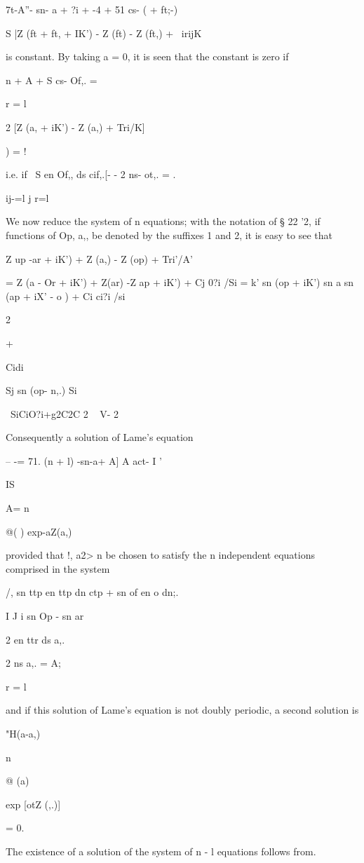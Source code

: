 {{{{{{{{7t-A''- sn- a + ?i + -4 + 51 cs- ( + ft;-)

S |Z (ft + ft, + IK') - Z (ft) - Z (ft,) + \ irijK\

%
%

is constant. By taking a = 0, it is seen that the constant is zero if

n + A + S cs- Of,. =

r = l

2 [Z (a, + iK') - Z (a,) + Tri/K]

) = !

i.e. if \ S en Of,, ds cif,.[- - 2 ns- ot,. = .

ij-=l j r=l

We now reduce the system of n equations; with the notation of § 22
'2, if functions of Op, a,, be denoted by the suffixes 1 and 2, it is
easy to see that

Z up -ar + iK') + Z (a,) - Z (op) + Tri'/A'

= Z (a - Or + iK') + Z(ar) -Z ap + iK') + Cj 0?i /Si = k' sn (op +
iK') sn a sn (ap + iX' - o ) + Ci ci?i /si

 2

+

Cidi

Sj sn (op- n,.) Si

\ SiCiO?i+g2C2C 2 ~ V- 2

Consequently a solution of Lame's equation

-- -= 71. (n + l) -sn-a+ A] A act- I '

IS

A= n

@( ) exp-aZ(a,)

provided that !, a2>  n be chosen to satisfy the n independent
equations comprised in the system

/, sn ttp en ttp dn ctp + sn of en o dn;. \

I J i sn Op - sn ar

2 en ttr ds a,.

2 ns a,. = A;

r = l

and if this solution of Lame's equation is not doubly periodic, a
second solution is

"H(a-a,)

n

@ (a)

exp [otZ (,.)]

= 0.

The existence of a solution of the system of n - l equations follows
from.

}}}}}}}}
